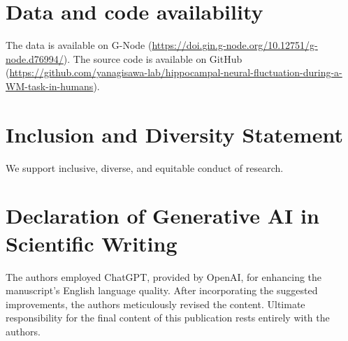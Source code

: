 \documentclass[final,3p,times,twocolumn]{elsarticle}
\begin{document}
\section*{Data and code availability}
The data is available on G-Node (\url{https://doi.gin.g-node.org/10.12751/g-node.d76994/}). The source code is available on GitHub (\url{https://github.com/yanagisawa-lab/hippocampal-neural-fluctuation-during-a-WM-task-in-humans}).
\label{data and code availability}

\section*{Inclusion and Diversity Statement}
We support inclusive, diverse, and equitable conduct of research.
\label{inclusion and diversity statement}

\section*{Declaration of Generative AI in Scientific Writing}
The authors employed ChatGPT, provided by OpenAI, for enhancing the manuscript's English language quality. After incorporating the suggested improvements, the authors meticulously revised the content. Ultimate responsibility for the final content of this publication rests entirely with the authors.
\label{declaration of generative ai in scientific writing}



\clearpage
\end{document}
